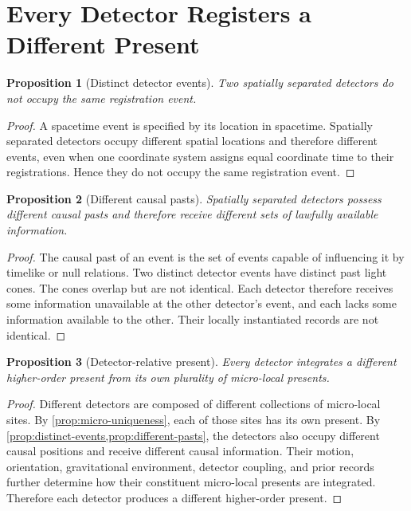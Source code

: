 \documentclass[12pt,onecolumn]{article}
\newtheorem{proposition}{Proposition}[section]
\begin{document}
\section{Every Detector Registers a Different Present}

\begin{proposition}[Distinct detector events]
\label{prop:distinct-events}
Two spatially separated detectors do not occupy the same registration event.
\end{proposition}

\begin{proof}
A spacetime event is specified by its location in spacetime. Spatially separated detectors occupy different spatial locations and therefore different events, even when one coordinate system assigns equal coordinate time to their registrations. Hence they do not occupy the same registration event.
\end{proof}

\begin{proposition}[Different causal pasts]
\label{prop:different-pasts}
Spatially separated detectors possess different causal pasts and therefore receive different sets of lawfully available information.
\end{proposition}

\begin{proof}
The causal past of an event is the set of events capable of influencing it by timelike or null relations. Two distinct detector events have distinct past light cones. The cones overlap but are not identical. Each detector therefore receives some information unavailable at the other detector's event, and each lacks some information available to the other. Their locally instantiated records are not identical.
\end{proof}

\begin{proposition}[Detector-relative present]
\label{prop:detector-relative}
Every detector integrates a different higher-order present from its own plurality of micro-local presents.
\end{proposition}

\begin{proof}
Different detectors are composed of different collections of micro-local sites. By \cref{prop:micro-uniqueness}, each of those sites has its own present. By \cref{prop:distinct-events,prop:different-pasts}, the detectors also occupy different causal positions and receive different causal information. Their motion, orientation, gravitational environment, detector coupling, and prior records further determine how their constituent micro-local presents are integrated. Therefore each detector produces a different higher-order present.
\end{proof}
\end{document}
